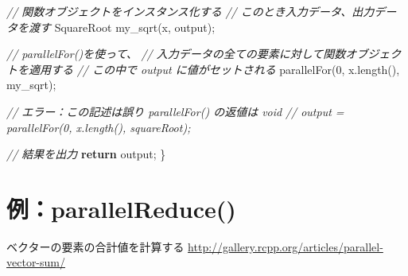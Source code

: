 \documentclass[]{book}
\newenvironment{Shaded}{\begin{snugshade}}{\end{snugshade}}
\newcommand{\CommentTok}[1]{\textcolor[rgb]{0.56,0.35,0.01}{\textit{#1}}}
\newcommand{\ControlFlowTok}[1]{\textcolor[rgb]{0.13,0.29,0.53}{\textbf{#1}}}
\newcommand{\DecValTok}[1]{\textcolor[rgb]{0.00,0.00,0.81}{#1}}
\newcommand{\NormalTok}[1]{#1}
\begin{document}
\begin{Shaded}
\begin{Highlighting}[]
  \CommentTok{// 関数オブジェクトをインスタンス化する}
  \CommentTok{// このとき入力データ、出力データを渡す}
\NormalTok{  SquareRoot my_sqrt(x, output);}
  
  \CommentTok{// parallelFor()を使って、}
  \CommentTok{// 入力データの全ての要素に対して関数オブジェクトを適用する}
  \CommentTok{// この中で output に値がセットされる}
\NormalTok{  parallelFor(}\DecValTok{0}\NormalTok{, x.length(), my_sqrt);}
  
  \CommentTok{// エラー：この記述は誤り parallelFor() の返値は void}
  \CommentTok{// output = parallelFor(0, x.length(), squareRoot);}
  
  \CommentTok{// 結果を出力}
  \ControlFlowTok{return}\NormalTok{ output;}
\NormalTok{\}}
\end{Highlighting}
\end{Shaded}

\hypertarget{parallelreduce}{%
\section{例：parallelReduce()}\label{parallelreduce}}

ベクターの要素の合計値を計算する
\url{http://gallery.rcpp.org/articles/parallel-vector-sum/}
\end{document}
